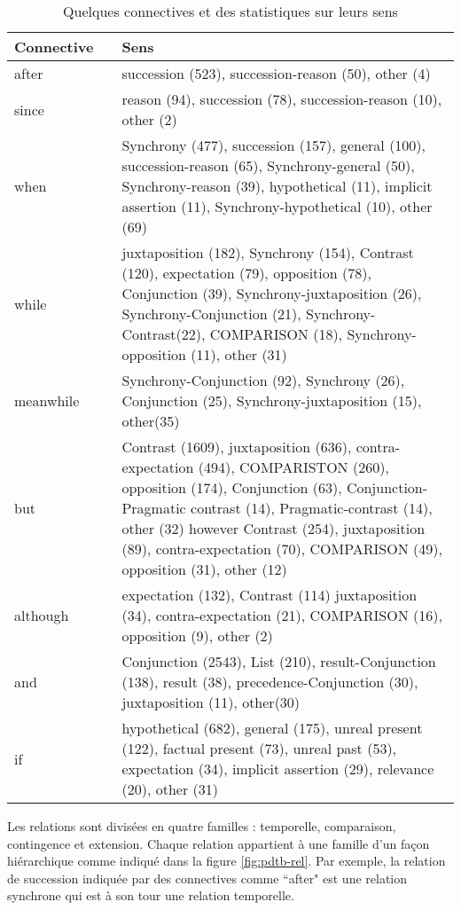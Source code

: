 \documentclass{KodeBook}
\begin{document}
\begin{table}[ht]
	\centering\small
	\begin{tabular}{p{}lp{}}
		\hline\hline
		\textbf{Connective} && \textbf{Sens}\\
		\hline
		
		after && succession (523), succession-reason (50), other (4) \\
		since && reason (94), succession (78), succession-reason (10), other (2) \\
		when && Synchrony (477), succession (157), general (100), succession-reason (65), Synchrony-general (50),
		Synchrony-reason (39), hypothetical (11), implicit assertion (11), Synchrony-hypothetical (10), other
		(69) \\
		while && juxtaposition (182), Synchrony (154), Contrast (120), expectation (79), opposition (78), Conjunction
		(39), Synchrony-juxtaposition (26), Synchrony-Conjunction (21), Synchrony-Contrast(22), COMPARISON (18), Synchrony-opposition (11), other (31) \\
		meanwhile && Synchrony-Conjunction (92), Synchrony (26), Conjunction (25), Synchrony-juxtaposition (15),
		other(35)\\
		but && Contrast (1609), juxtaposition (636), contra-expectation (494), COMPARISTON (260), opposition
		(174), Conjunction (63), Conjunction-Pragmatic contrast (14), Pragmatic-contrast (14), other (32)
		however Contrast (254), juxtaposition (89), contra-expectation (70), COMPARISON (49), opposition (31),
		other (12)\\
		although && expectation (132), Contrast (114) juxtaposition (34), contra-expectation (21), COMPARISON (16),
		opposition (9), other (2)\\
		and && Conjunction (2543), List (210), result-Conjunction (138), result (38), precedence-Conjunction (30),
		juxtaposition (11), other(30)\\
		if && hypothetical (682), general (175), unreal present (122), factual present (73), unreal past (53), expectation (34), implicit assertion (29), relevance (20), other (31)\\
		\hline\hline
	\end{tabular}
	\caption[Quelques connectives et des statistiques sur leurs sens]{Quelques connectives et des statistiques sur leurs sens \cite{2008-prasad-al}}
	\label{tab:pdtb-connect}
\end{table}

Les relations  sont divisées en quatre familles : temporelle, comparaison, contingence et extension. 
Chaque relation appartient à une famille d'un façon hiérarchique comme indiqué dans la figure \ref{fig:pdtb-rel}. 
Par exemple, la relation de succession indiquée par des connectives comme ``after" est une relation synchrone qui est à son tour une relation temporelle.
\end{document}
